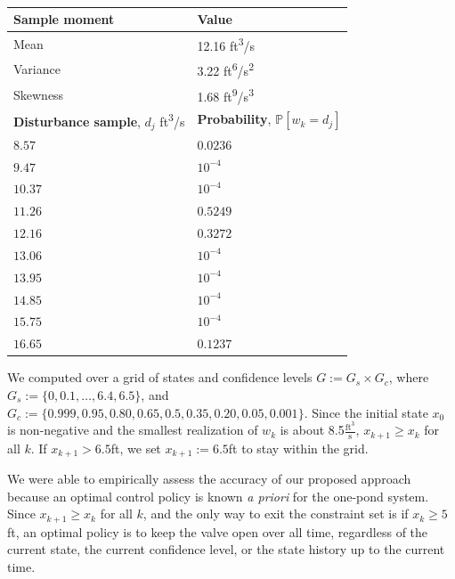 \documentclass[letterpaper, 10 pt, conference]{ieeeconf}  %
\begin{document}
\begin{table}[b]
\vspace{-2em}
\begin{center}
\caption{}
\begin{tabular}{| p{3.5cm} | p{3.5cm} |}
\hline
\bf{Sample moment} & \bf{Value}  \\ \hline
Mean & 12.16 ft\textsuperscript{3}/s \\ 
Variance & 3.22 ft\textsuperscript{6}/s\textsuperscript{2} \\ 
Skewness & 1.68 ft\textsuperscript{9}/s\textsuperscript{3} \\ 
\hline 
\textbf{Disturbance sample}, $d_j$ ft\textsuperscript{3}/s & \textbf{Probability}, $\mathbb{P}[w_k = d_j]$ \\ \hline
$8.57$ 		& $0.0236$ \\
$9.47$ 		& $10^{-4}$ \\
$10.37$ 		& $10^{-4}$ \\
$11.26$  & $0.5249$ \\ 
$12.16$ & $0.3272$ \\ 
$13.06$  & $10^{-4}$ \\ 
$13.95$  & $10^{-4}$ \\ 
$14.85$  & $10^{-4}$ \\ 
$15.75$  & $10^{-4}$ \\ 
$16.65$  & $0.1237$ \\ \hline
\end{tabular}
\begin{flushleft} \end{flushleft}
\label{dist}
\end{center}
\vspace{-2em}
\end{table}
%
We computed over a grid of states and confidence levels $G := G_s \times G_c$, where  
$G_s := \{0, 0.1, \dots, 6.4, 6.5\}$,
and $G_c := \{0.999, 0.95, 0.80, 0.65, 0.5, 0.35, 0.20, 0.05, 0.001\}$.
Since the initial state $x_0$ is non-negative and the smallest realization of $w_k$ is about 8.5$\frac{\text{ft}^3}{\text{s}}$, 
$x_{k+1}\geq x_k$ for all $k$. 
If $x_{k+1} > 6.5$ft, we set $x_{k+1} := 6.5$ft to stay within the grid.

We were able to empirically assess the accuracy of our proposed approach because an optimal control policy is known \textit{a priori} for the one-pond system.
Since $x_{k+1}\geq x_k$ for all $k$, and the only way to exit the constraint set is if $x_k \geq 5$ft,
an optimal policy is to keep the valve open over all time, regardless of the current state, the current confidence level, or the state history up to the current time.
\end{document}
